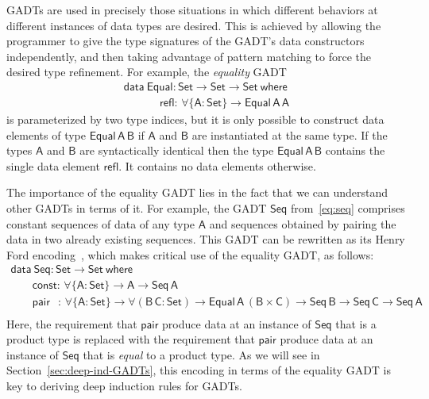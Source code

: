 \documentclass[9pt]{entcs}
\begin{document}
GADTs are used in precisely those situations in which different
behaviors at different instances of data types are desired. This is
achieved by allowing the programmer to give the type signatures of the
GADT's data constructors independently, and then taking advantage of
pattern matching to force the desired type refinement. For example,
the {\em equality} GADT
\begin{equation}\label{eq:equal}
\begin{array}{l}
\mathsf{data\ Equal : Set \to Set \to Set\ where}\\
\mathsf{\;\;\;\;\;\;\;\;\;\;\;\,refl :\, \forall \{A : Set\} \to Equal\,A\,A}
\end{array}
\end{equation}
is parameterized by two type indices, but it is only possible to
construct data elements of type $\mathsf{Equal\,A\,B}$ if $\mathsf{A}$
and $\mathsf{B}$ are instantiated at the same type. If the types
$\mathsf{A}$ and $\mathsf{B}$ are syntactically identical then the
type $\mathsf{Equal\,A\,B}$ contains the single data element
$\mathsf{refl}$. It contains no data elements otherwise.

The importance of the equality GADT lies in the fact that we can
understand other GADTs in terms of it. For example, the GADT
$\mathsf{Seq}$ from~\eqref{eq:seq} comprises constant sequences of
data of any type $\mathsf{A}$ and sequences obtained by pairing the
data in two already existing sequences. This GADT can be rewritten as
its Henry Ford encoding~\cite{ch03,hin03,mcb99,sjsv09,sp04}, which
makes critical use of the equality GADT, as follows:
\begin{equation}\label{eq:eq_seq}
\begin{array}{l}
\mathsf{data\ Seq : Set \to Set\ where}\\
\mathsf{\;\;\;\;\;\;\;const :\, \forall \{A : Set\} \to A \to Seq\,A}\\ 
\mathsf{\;\;\;\;\;\;\;pair\,\;\; :\, \forall \{A : Set\} \to \forall (B\,C : Set) \to
  Equal\,A\,(B \times C) \to Seq\,B \to Seq\,C \to Seq\,A}\\ 
\end{array}
\end{equation}
Here, the requirement that $\mathsf{pair}$ produce data at an instance
of $\mathsf{Seq}$ that is a product type is replaced with the
requirement that $\mathsf{pair}$ produce data at an instance of
$\mathsf{Seq}$ that is \emph{equal} to a product type. As we will see
in Section~\ref{sec:deep-ind-GADTs}, this encoding in terms of the
equality GADT is key to deriving deep induction rules for GADTs.
\end{document}
